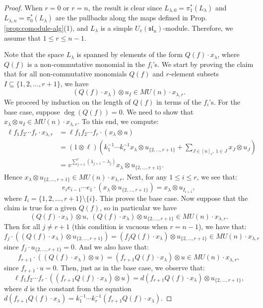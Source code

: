 \documentclass{amsart}
\numberwithin{equation}{section}
\theoremstyle{theorem}
\theoremstyle{definition}
\newcommand{\sub}{\subseteq}
\newcommand{\sm}{\setminus}
\newcommand{\sll}{\mathfrak{sl}}
\newcommand{\uvsln}{U_v(\sll_n)}
\begin{document}
\begin{proof}
When $r=0$ or $r=n$, the result is clear since $L_{\lambda,0}=\pi_1^*(L_{\lambda})$ and $L_{\lambda,n}=\pi_0^*(L_{\lambda})$ are the pullbacks along the maps defined in Prop. \ref{prop:comodule-alg}(1), and $L_{\lambda}$ is a simple $\uvsln$-module. Therefore, we assume that $1\leq r\leq n-1$. 

Note that the space $L_{\lambda}$ is spanned by elements of the form $Q(f)\cdot x_{\lambda}$, where $Q(f)$ is a non-commutative monomial in the $f_i$'s.
We start by proving the claim that for all non-commutative monomials $Q(f)$ and $r$-element subsets $I\sub \{1,2,\dots, r+1\}$, we have
\[(Q(f)\cdot x_{\lambda})\otimes u_I\in MU(n)\cdot x_{\lambda,r}.\]
We proceed by induction on the length of $Q(f)$ in terms of the $f_i$'s.
 For the base case, suppose $\deg(Q(f))=0$. We need to show that $x_{\lambda}\otimes u_I \in MU(n)\cdot x_{\lambda,r}$. To this end, we compute:
\begin{align*}\ell f_1f_2 \cdots f_r\cdot x_{\lambda,r} &= \ell f_1f_2 \cdots f_r \cdot (x_{\lambda}\otimes u) \\
&= (1\otimes \ell)\left(k_1^{-1}\cdots k_r^{-1}x_\lambda\otimes u_{\{2,\ldots,r+1\}}+\sum_{J\in[n]_r,~1\in J}x_J\otimes u_J\right)\\
&= v^{\sum_{j=1}^r(\lambda_{j+1}-\lambda_j)}x_{\lambda}\otimes u_{\{2,\ldots,r+1\}}.\end{align*}
Hence $x_{\lambda}\otimes u_{\{2,\ldots,r+1\}}\in MU(n)\cdot x_{\lambda,r}$. Next, for any $1\leq i\leq r$, we see that:
\[e_i e_{i-1}\cdots e_1 \cdot (x_{\lambda}\otimes u_{\{2,\ldots,r+1\}}) = x_{\lambda}\otimes u_{I_{i+1}},\]
where $I_i =\{1,2,\dots, r+1\}\sm\{i\}$. This proves the base case. Now suppose that the claim is true for a given $Q(f)$, so in particular we have \[(Q(f)\cdot x_{\lambda})\otimes  u,~(Q(f)\cdot x_{\lambda})\otimes  u_{\{2,\ldots,r+1\}} \in MU(n)\cdot x_{\lambda,r}.\]
Then for all $j\neq r+1$ (this condition is vacuous when $r=n-1$), we have that:
\[f_j\cdot ((Q(f)\cdot x_{\lambda})\otimes u_{\{2,\ldots,r+1\}}) = (f_j Q(f)\cdot x_{\lambda})\otimes u_{\{2,\ldots,r+1\}}\in MU(n)\cdot x_{\lambda,r}\]
since $f_j\cdot u_{\{2,\ldots,r+1\}}=0$.
And we also have that:
\[f_{r+1}\cdot ((Q(f)\cdot x_{\lambda})\otimes u) = (f_{r+1} Q(f)\cdot x_{\lambda})\otimes u\in MU(n)\cdot x_{\lambda,r},\]
since $f_{r+1}\cdot u=0$.
Then, just as in the base case, we observe that:
\[\ell f_1f_2 \cdots f_r\cdot ((f_{r+1} Q(f)\cdot x_{\lambda})\otimes u) = d(f_{r+1} Q(f)\cdot x_{\lambda})\otimes u_{\{2,\ldots,r+1\}},\]
where $d$ is the constant from the equation $d(f_{r+1} Q(f)\cdot x_{\lambda}) = k_1^{-1}\cdots k_r^{-1}(f_{r+1} Q(f)\cdot x_{\lambda})$.


\end{proof}
\end{document}

